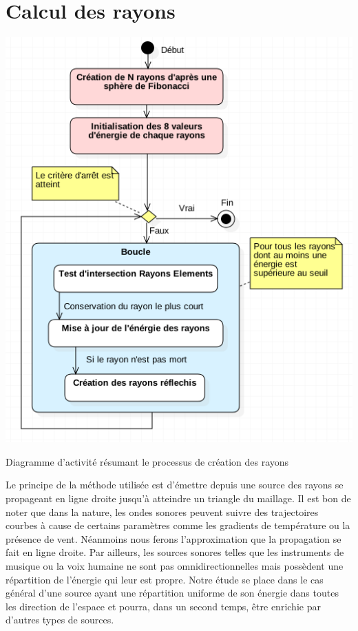 \section{Calcul des rayons} \label{sect_rayon}

\begin{figureth}
	\includegraphics[width=0.7\linewidth]{images/DiagRay}
	\caption{Diagramme d'activité résumant le processus de création des rayons}
	\label{DiagRay}
\end{figureth}

Le principe de la méthode utilisée est d'émettre depuis une source des rayons se propageant en ligne droite jusqu'à atteindre un triangle du maillage. Il est bon de noter que dans la nature, les ondes sonores peuvent suivre des trajectoires courbes à cause de certains paramètres comme les gradients de température ou la présence de vent. Néanmoins nous ferons l'approximation que la propagation se fait en ligne droite. Par ailleurs, les sources sonores telles que les instruments de musique ou la voix humaine ne sont pas omnidirectionnelles mais possèdent une répartition de l'énergie qui leur est propre. Notre étude se place dans le cas général d'une source ayant une répartition uniforme de son énergie dans toutes les direction de l'espace et pourra, dans un second temps, être enrichie par d'autres types de sources. 

